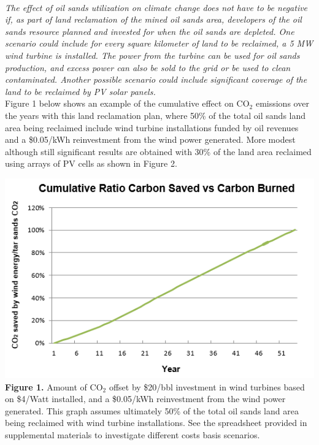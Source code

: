 \documentclass[11pt]{article}
\begin{document}
 \\

\emph{The effect of oil sands utilization on climate change does not have to be negative if, as part of land reclamation of the mined oil sands area, developers of the oil sands resource planned and invested for when the oil sands are depleted. One scenario could include for every square kilometer of land to be reclaimed, a 5 MW wind turbine is installed. The power from the turbine can be used for oil sands production, and excess power can also be sold to the grid or be used to clean contaminated. Another possible scenario could include significant coverage of the land to be reclaimed by PV solar panels. } \\
  
Figure 1 below shows an example of the cumulative effect on CO$_2$ emissions over the years with this land reclamation plan, where 50\% of the total oil sands land area being reclaimed include wind turbine installations funded by oil revenues and a \$0.05/kWh reinvestment from the wind power generated. More modest although still significant results are obtained with 30\% of the land area reclaimed using arrays of PV cells as shown in Figure 2. \\

\begin{center}
\includegraphics{g1.png} \\
{\bf Figure 1.} Amount of CO$_2$ offset by \$20/bbl investment in wind turbines based on \$4/Watt installed, and a \$0.05/kWh reinvestment from the wind power generated. This graph assumes ultimately 50\% of the total oil sands land area being reclaimed with wind turbine installations. See the spreadsheet provided in supplemental materials to investigate different costs basis scenarios.
\end{center}
\end{document}
